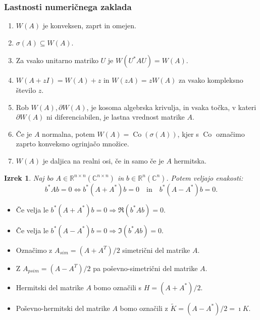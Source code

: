 \documentclass{beamer}
\newcommand{\Co}{\operatorname{Co}} %
\newcommand{\R}{\mathbb R}
\newcommand{\C}{\mathbb C}
\newtheorem{izrek}{Izrek}
\begin{document}
\begin{frame}
\frametitle{Lastnosti numeričnega zaklada}
\begin{enumerate}[1.]
\item $W(A)$ je konveksen, zaprt in omejen.
\item $\sigma(A)\subseteq W(A).$
\item Za vsako unitarno matriko $U$ je $W(U^\ast AU)=W(A).$
\item $W(A+zI)=W(A)+z$ in $W(zA)=zW(A)$ za vsako kompleksno število $z$.
\item Rob $W(A), \partial W(A)$, je kosoma algebrska krivulja, in vsaka točka, v kateri $\partial W(A)$ ni diferenciabilen, je lastna vrednost matrike $A$.
\item Če je $A$ normalna, potem $W(A)=\Co(\sigma(A))$, kjer s $\Co$ označimo zaprto konveksno ogrinjačo množice.
\item $W(A)$ je daljica na realni osi, če in samo če je $A$ hermitska.
\end{enumerate}
\end{frame}
\begin{frame}
\begin{izrek}
Naj bo $A\in\R^{n\times n} (\C^{n\times n})$ in $b\in\R^n(\C^n)$.  Potem veljajo enakosti:
$$b^\ast Ab=0\Leftrightarrow b^\ast (A+A^\ast)b=0 \quad \text{in}\quad  b^\ast(A-A^\ast)b=0.$$
\end{izrek}\pause
\begin{itemize}
\item Če velja le $b^\ast (A+A^\ast)b=0 \Rightarrow \Re(b^\ast Ab)=0$.
\item Če velja le $b^\ast(A-A^\ast)b=0 \Rightarrow \Im(b^\ast Ab)=0$.
\item Označimo z $A_{sim}=(A+A^T)/2$ simetrični del matrike $A$.
\item Z $A_{psim}=(A-A^T)/2$ pa poševno-simetrični del matrike $A$.
\item Hermitski del matrike $A$ bomo označili s $H=(A+A^\ast)/2$.
\item Poševno-hermitski del matrike $A$ bomo označili z \medskip$\tilde{K}=(A-A^\ast)/2=\imath K$.
\end{itemize}
\end{frame}
\end{document}
